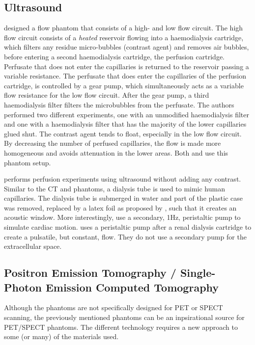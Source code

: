 \subsection{Ultrasound}

\cite{veltmann2002design} designed a flow phantom that consists of a high- and low flow circuit. The high flow circuit consists of a \textit{heated} reservoir flowing into a haemodialysis cartridge, which filters any residue micro-bubbles (contrast agent) and removes air bubbles, before entering a second haemodialysis cartridge, the perfusion cartridge. Perfusate that does not enter the capillaries is returned to the reservoir passing a variable resistance. The perfusate that does enter the capillaries of the perfusion cartridge, is controlled by a gear pump, which simultaneously acts as a variable flow resistance for the low flow circuit. After the gear pump, a third haemodialysis filter filters the microbubbles from the perfusate. The authors performed two different experiments, one with an unmodified haemodialysis filter and one with a haemodialysis filter that has the majority of the lower capillaries glued shut. The contrast agent tends to float, especially in the low flow circuit. By decreasing the number of perfused capillaries, the flow is made more homogeneous and avoids attenuation in the lower areas. Both \cite{sakano2015power} and \cite{lohmaier2004vitro} use this phantom setup.

\cite{kim2016efficiency} performs perfusion experiments using ultrasound without adding any contrast. Similar to the \ac{CT} and  phantoms, a dialysis tube is used to mimic human capillaries. The dialysis tube is submerged in water and part of the plastic case was removed, replaced by a latex foil as proposed by \cite{veltmann2002design}, such that it creates an acoustic window. More interestingly, \cite{kim2016efficiency} use a secondary, 1Hz, peristaltic pump to simulate cardiac motion. \cite{gauthier2011perfusion} uses a peristaltic pump after a renal dialysis cartridge to create a pulsatile, but constant, flow. They do not use a secondary pump for the extracellular space.

\subsection{Positron Emission Tomography / Single-Photon Emission Computed Tomography}
Although the phantoms are not specifically designed for \ac{PET} or \ac{SPECT} scanning, the previously mentioned phantoms can be an inpsirational source for \ac{PET}/\ac{SPECT} phantoms. The different technology requires a new approach to some (or many) of the materials used.

